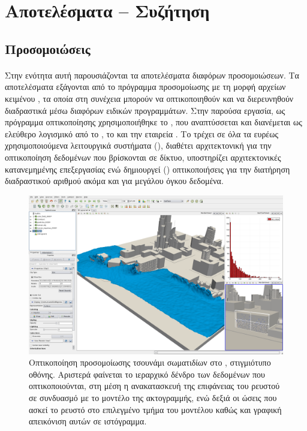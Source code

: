 \section{Αποτελέσματα -- Συζήτηση}

\subsection{Προσομοιώσεις}

\paragraph{} Στην ενότητα αυτή παρουσιάζονται τα αποτελέσματα διαφόρων προσομοιώσεων. Τα
αποτελέσματα εξάγονται από το πρόγραμμα προσομοίωσης με τη μορφή αρχείων κειμένου
, τα οποία στη συνέχεια μπορούν να οπτικοποιηθούν και να διερευνηθούν διαδραστικά
μέσω διαφόρων ειδικών προγραμμάτων. Στην παρούσα εργασία, ως πρόγραμμα οπτικοποίησης
χρησιμοποιήθηκε το , που αναπτύσσεται και διανέμεται ως ελεύθερο λογισμικό
από το , το  και την
εταιρεία . Το  τρέχει σε όλα τα ευρέως χρησιμοποιούμενα
λειτουργικά συστήματα (), διαθέτει αρχιτεκτονική
 για την οπτικοποίηση δεδομένων που βρίσκονται σε δίκτυο, υποστηρίζει
αρχιτεκτονικές κατανεμημένης επεξεργασίας ενώ δημιουργεί  ()
οπτικοποιήσεις για την διατήρηση διαδραστικού αριθμού  ακόμα και για μεγάλου
όγκου δεδομένα.

\begin{figure}
  \centering
  \includegraphics[width=\textwidth]{figures/paraview-interface.png}
  \caption[Οπτικοποίηση προσομοίωσης] {Οπτικοποίηση προσομοίωσης τσουνάμι 
    σωματιδίων στο , στιγμιότυπο οθόνης. Αριστερά φαίνεται το ιεραρχικό
    δένδρο των δεδομένων που οπτικοποιούνται, στη μέση η ανακατασκευή της επιφάνειας του
    ρευστού σε συνδυασμό με το μοντέλο της ακτογραμμής, ενώ δεξιά οι ώσεις που ασκεί το
    ρευστό στο επιλεγμένο τμήμα του μοντέλου καθώς και γραφική απεικόνιση αυτών σε
    ιστόγραμμα.}
  \label{fig:paraview-interface}
\end{figure}

